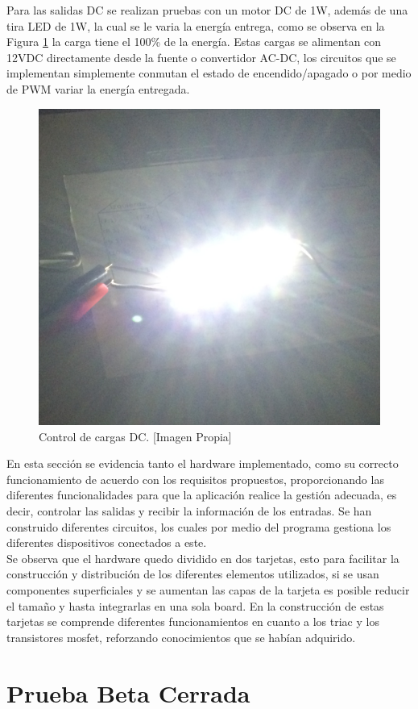 Para las salidas DC se realizan pruebas con un motor DC de 1W, además de una tira LED de 1W, la cual se le varia la energía entrega, como se observa en la Figura \ref{fig:DCc} la carga tiene el 100\% de la energía. Estas cargas se alimentan con 12VDC directamente desde la fuente o convertidor AC-DC, los circuitos que se implementan simplemente conmutan el estado de encendido/apagado o por medio de PWM variar la energía entregada.\\

\begin{figure}[H]
	\centering
	\caption[Control de cargas DC.]{Control de cargas DC. [Imagen Propia]}
	\label{fig:DCc}
	\includegraphics[width=0.5\linewidth]{Imagenes/DC1}
\end{figure}

En esta sección se evidencia tanto el hardware implementado, como su correcto funcionamiento de acuerdo con los requisitos propuestos, proporcionando las diferentes funcionalidades para que la aplicación realice la gestión adecuada, es decir, controlar las salidas y recibir la información de los entradas. Se han construido diferentes circuitos, los cuales por medio del programa gestiona los diferentes dispositivos conectados a este.\\

Se observa que el hardware quedo dividido en dos tarjetas, esto para facilitar la construcción y distribución de los diferentes elementos utilizados, si se usan componentes superficiales y se aumentan las capas de la tarjeta es posible reducir el tamaño y hasta integrarlas en una sola board. En la construcción de estas tarjetas se comprende diferentes funcionamientos en cuanto a los triac y los transistores mosfet, reforzando conocimientos que se habían adquirido.\\

\section{Prueba Beta Cerrada}


